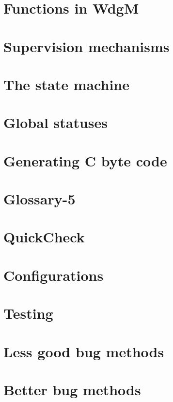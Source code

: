 \documentclass[a4paper]{article}
\begin{document}
\section{Functions in WdgM}
\section{Supervision mechanisms}
\section{The state machine}
\section{Global statuses}
\section{Generating C byte code}
\section{Glossary-5}
\section{QuickCheck}
\section{Configurations}
\section{Testing}
\section{Less good bug methods}
\section{Better bug methods}
\section{}
\section{}
\section{}
\section{}
\end{document}

